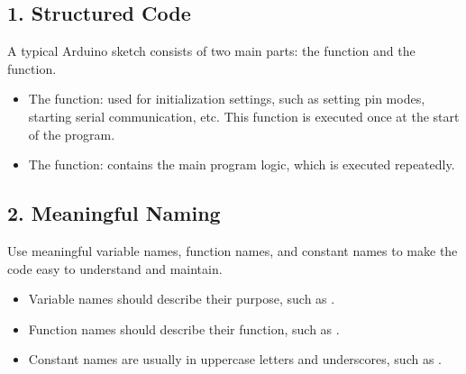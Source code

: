 \documentclass[a4paper,11pt,english]{sphinxmanual}
\begin{document}
\subsection{1. Structured Code}
\label{\detokenize{Get_Started_with_Arduino/Sketch_Writing_Rules:structured-code}}
\sphinxAtStartPar
A typical Arduino sketch consists of two main parts: the  function and the  function.
\begin{itemize}
\item {} 
\sphinxAtStartPar
The  function: used for initialization settings, such as setting pin modes, starting serial communication, etc. This function is executed once at the start of the program.

\begin{sphinxVerbatim}[commandchars=\\\{\}]
\end{sphinxVerbatim}

\item {} 
\sphinxAtStartPar
The  function: contains the main program logic, which is executed repeatedly.

\begin{sphinxVerbatim}[commandchars=\\\{\}]
\end{sphinxVerbatim}

\end{itemize}


\subsection{2. Meaningful Naming}
\label{\detokenize{Get_Started_with_Arduino/Sketch_Writing_Rules:meaningful-naming}}
\sphinxAtStartPar
Use meaningful variable names, function names, and constant names to make the code easy to understand and maintain.
\begin{itemize}
\item {} 
\sphinxAtStartPar
Variable names should describe their purpose, such as .

\item {} 
\sphinxAtStartPar
Function names should describe their function, such as .

\item {} 
\sphinxAtStartPar
Constant names are usually in uppercase letters and underscores, such as .

\end{itemize}
\end{document}
